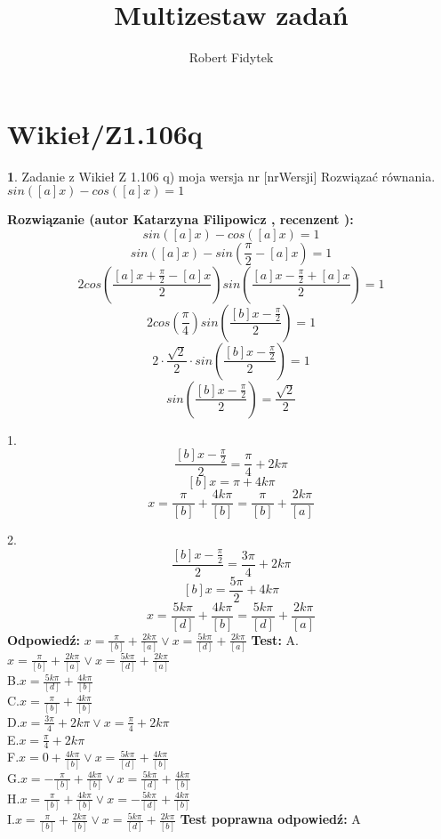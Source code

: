 \documentclass[12pt, a4paper]{article}
\title{Multizestaw zadań}
\author{Robert Fidytek}
\date{}
\theoremstyle{definition} %
\newtheorem{zad}{}
\newcommand{\kategoria}[1]{\section{#1}} %
\newcommand{\zadStart}[1]{\begin{zad}#1\newline} %
\newcommand{\zadStop}{\end{zad}}   %
\newcommand{\rozwStart}[2]{\noindent \textbf{Rozwiązanie (autor #1 , recenzent #2): }\newline} %
\newcommand{\rozwStop}{\newline}                                            %
\newcommand{\odpStart}{\noindent \textbf{Odpowiedź:}\newline}    %
\newcommand{\odpStop}{\newline}                                             %
\newcommand{\testStart}{\noindent \textbf{Test:}\newline} %
\newcommand{\testStop}{\newline} %
\newcommand{\kluczStart}{\noindent \textbf{Test poprawna odpowiedź:}\newline} %
\newcommand{\kluczStop}{\newline} %
\begin{document}
\maketitle


\kategoria{Wikieł/Z1.106q}
\zadStart{Zadanie z Wikieł Z 1.106 q) moja wersja nr [nrWersji]}
Rozwiązać równania.\\
 $sin\left([a]x\right)-cos\left([a]x\right)=1$
\zadStop
\rozwStart{Katarzyna Filipowicz}{}
$$
sin\left([a]x\right)-cos\left([a]x\right)=1
$$ $$
sin\left([a]x\right)-sin\left(\frac{\pi}{2}-[a]x\right)=1
$$  $$
2cos\left(\frac{[a]x+\frac{\pi}{2}-[a]x}{2}\right)sin\left(\frac{[a]x-\frac{\pi}{2}+[a]x}{2}\right)=1
$$ $$
2cos\left(\frac{\pi}{4}\right)      sin\left(\frac{[b]x-\frac{\pi}{2}}{2}\right)=1
$$ $$
2\cdot \frac{\sqrt{2}}{2}\cdot     sin\left(\frac{[b]x-\frac{\pi}{2}}{2}\right)=1
$$  $$
sin\left(\frac{[b]x-\frac{\pi}{2}}{2}\right)=\frac{\sqrt{2}}{2}
$$ 

1. 
$$
\frac{[b]x-\frac{\pi}{2}}{2}=\frac{\pi}{4}+2k\pi
$$ $$
 [b]x=\pi+4k\pi
$$ $$
x=\frac{\pi}{[b]}+\frac{4k\pi}{[b]}=\frac{\pi}{[b]}+\frac{2k\pi}{[a]}
$$

2. 
$$
\frac{[b]x-\frac{\pi}{2}}{2}=\frac{3\pi}{4}+2k\pi
$$ $$
 [b]x=\frac{5\pi}{2}+4k\pi
$$ $$
x=\frac{5k\pi}{[d]}+\frac{4k\pi}{[b]}=\frac{5k\pi}{[d]}+\frac{2k\pi}{[a]}
$$
\rozwStop
\odpStart
$x=\frac{\pi}{[b]}+\frac{2k\pi}{[a]} \vee x=\frac{5k\pi}{[d]}+\frac{2k\pi}{[a]}$
\odpStop
\testStart
A.$x=\frac{\pi}{[b]}+\frac{2k\pi}{[a]} \vee x=\frac{5k\pi}{[d]}+\frac{2k\pi}{[a]}$\\
B.$x=\frac{5k\pi}{[d]}+\frac{4k\pi}{[b]}$\\
C.$x=\frac{\pi}{[b]}+\frac{4k\pi}{[b]}$\\
D.$x=\frac{3\pi}{4}+2k\pi \vee x=\frac{\pi}{4}+2k\pi$\\
E.$x=\frac{\pi}{4}+2k\pi$\\
F.$x=0+\frac{4k\pi}{[b]} \vee x=\frac{5k\pi}{[d]}+\frac{4k\pi}{[b]}$\\
G.$x=-\frac{\pi}{[b]}+\frac{4k\pi}{[b]} \vee x=\frac{5k\pi}{[d]}+\frac{4k\pi}{[b]}$\\
H.$x=\frac{\pi}{[b]}+\frac{4k\pi}{[b]} \vee x=-\frac{5k\pi}{[d]}+\frac{4k\pi}{[b]}$\\
I.$x=\frac{\pi}{[b]}+\frac{2k\pi}{[b]} \vee x=\frac{5k\pi}{[d]}+\frac{2k\pi}{[b]}$
\testStop
\kluczStart
A
\kluczStop
\end{document}

